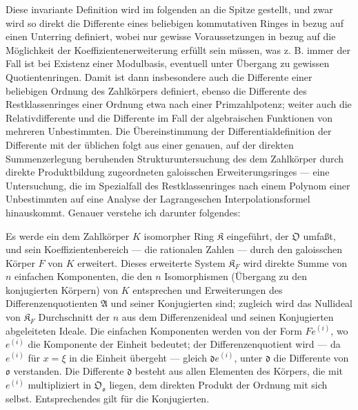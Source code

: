 Diese invariante Definition wird im folgenden an die Spitze gestellt, und zwar wird so direkt die Differente eines beliebigen kommutativen Ringes in bezug auf einen Unterring definiert, wobei nur gewisse Voraussetzungen in bezug auf die Möglichkeit der Koeffizientenerweiterung erfüllt sein müssen, was z. B. immer der Fall ist bei Existenz einer Modulbasis, eventuell unter Übergang zu gewissen Quotientenringen. Damit ist dann insbesondere auch die Differente einer beliebigen Ordnung des Zahlkörpers definiert, ebenso die Differente des Restklassenringes einer Ordnung etwa nach einer Primzahlpotenz; weiter auch die Relativdifferente und die Differente im Fall der algebraischen Funktionen von mehreren Unbestimmten. Die Übereinstimmung der Differentialdefinition der Differente mit der üblichen folgt aus einer genauen, auf der direkten Summenzerlegung beruhenden Strukturuntersuchung des dem Zahlkörper durch direkte Produktbildung zugeordneten galoisschen Erweiterungsringes --- eine Untersuchung, die im Spezialfall des Restklassenringes nach einem Polynom einer Unbestimmten auf eine Analyse der Lagrangeschen Interpolationsformel hinauskommt. Genauer verstehe ich darunter folgendes:

Es werde ein dem Zahlkörper $K$ isomorpher Ring $\mathfrak K$ eingeführt, der $\mathfrak O$ umfaßt, und sein Koeffizientenbereich --- die rationalen Zahlen --- durch den galoisschen Körper $F$ von $K$ erweitert. Dieses erweiterte System $\mathfrak K_F$ wird direkte Summe von $n$ einfachen Komponenten, die den $n$ Isomorphismen (Übergang zu den konjugierten Körpern) von $K$ entsprechen und Erweiterungen des Differenzenquotienten $\mathfrak A$ und seiner Konjugierten sind; zugleich wird das Nullideal von $\mathfrak K_F$ Durchschnitt der $n$ aus dem Differenzenideal und seinen Konjugierten abgeleiteten Ideale. Die einfachen Komponenten werden von der Form $Fe^{(i)}$, wo $e^{(i)}$ die Komponente der Einheit bedeutet; der Differenzenquotient wird --- da $e^{(i)}$ für $x=\xi$ in die Einheit übergeht --- gleich $\mathfrak d e^{(i)}$, unter $\mathfrak d$ die Differente von $\mathfrak o$ verstanden. Die Differente $\mathfrak d$ besteht aus allen Elementen des Körpers, die mit $e^{(i)}$ multipliziert in $\mathfrak O_{\mathfrak o}$ liegen, dem direkten Produkt der Ordnung mit sich selbst. Entsprechendes gilt für die Konjugierten.

